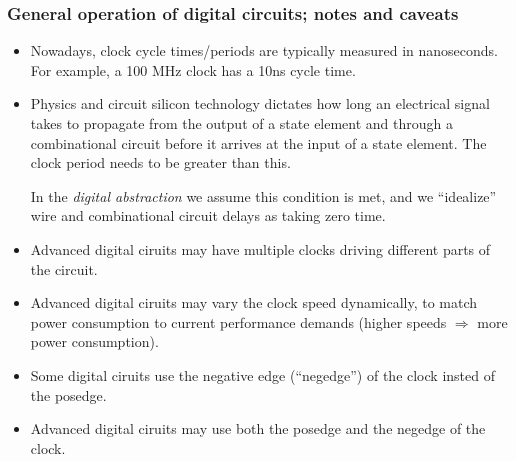 
\begin{frame}
\frametitle{General operation of digital circuits; notes and caveats}

\footnotesize

\begin{itemize}
 \item Nowadays, clock cycle times/periods are typically measured in
       nanoseconds. \\
       For example, a 100 MHz clock has a 10ns cycle time.

 \item Physics and circuit silicon technology dictates how long an
       electrical signal takes to propagate from the output of a state
       element and through a combinational circuit before it arrives
       at the input of a state element.  The clock period needs to be
       greater than this.

       In the \emph{digital abstraction} we assume this condition is
       met, and we ``idealize'' wire and combinational circuit delays
       as taking zero time.

\end{itemize}

\PAUSE{\vspace{2ex}}

\begin{itemize}

 \item Advanced digital ciruits may have multiple clocks driving
       different parts of the circuit.

 \item Advanced digital ciruits may vary the clock speed dynamically,
       to match power consumption to current performance demands
       (higher speeds $\Rightarrow$ more power consumption).

 \item Some digital ciruits use the negative edge (``negedge'') of the
       clock insted of the posedge.

 \item Advanced digital ciruits may use both the posedge and the
       negedge of the clock.

\end{itemize}

\end{frame}


